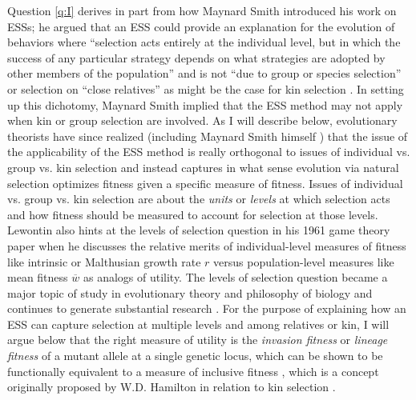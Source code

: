 \documentclass[11pt]{article}
\newcommand{\mean}[1]{\overline{#1}}
\begin{document}
Question \ref{q:I} derives in part from how Maynard Smith introduced his work on ESSs; he argued that an ESS could provide an explanation for the evolution of behaviors where ``selection acts entirely at the individual level, but in which the success of any particular strategy depends on what strategies are adopted by other members of the population'' \cite[p. 210]{Maynard-Smith:1974} and is not ``due to group or species selection'' \cite[p. 15]{Maynard-Smith:Price:1973} or selection on ``close relatives'' \cite[p. 210]{Maynard-Smith:1974} as might be the case for kin selection \cite{Hamilton:1964}. In setting up this dichotomy, Maynard Smith implied that the ESS method may not apply when kin or group selection are involved. As I will describe below, evolutionary theorists have since realized (including Maynard Smith himself \cite[p. 33]{MaynardSmith:1978}) that the issue of the applicability of the ESS method is really orthogonal to issues of individual vs. group vs. kin selection and instead captures in what sense evolution via natural selection optimizes fitness given a specific measure of fitness. Issues of individual vs. group vs. kin selection are about the \textit{units} or \textit{levels} at which selection acts and how fitness should be measured to account for selection at those levels. Lewontin also hints at the levels of selection question in his 1961 game theory paper when he discusses the relative merits of individual-level measures of fitness like intrinsic or Malthusian growth rate $r$ versus population-level measures like mean fitness $\mean{w}$ \cite[pp. 400-401]{Lewontin:1961} as analogs of utility. The levels of selection question became a major topic of study in evolutionary theory \cite[e.g.,][]{Lewontin:1970,Dawkins:1982,Wilson:Sober:1989,Maynard-Smith:Szathmary:1995,Wilson:1997,Michod:1999,Michod:2006,Szathmary:2015} and philosophy of biology \cite{Hull:1980,Brandon:1982,Damuth:Heisler:1988,Lloyd:1992,Lloyd:1994,Sober:Wilson:1994,Okasha:2006,Okasha:2016} and continues to generate substantial research \cite[e.g.,][]{Black:Bourrat:2020,Cooney:Mori:2022,Veit:2022}. For the purpose of explaining how an ESS can capture selection at multiple levels and among relatives or kin, I will argue below that the right measure of utility is the \textit{invasion fitness} \cite{Metz:Nisbet:1992,Heino:Metz:1998} or \textit{lineage fitness} \cite{Lehmann:Alger:2015,Akcay:VanCleve:2016,Lehmann:Mullon:2016} of a mutant allele at a single genetic locus, which can be shown to be functionally equivalent to a measure of inclusive fitness \cite{Lehmann:Mullon:2016,Lehmann:Rousset:2020}, which is a concept originally proposed by W.D. Hamilton in relation to kin selection \cite{Hamilton:1964}.
\end{document}

